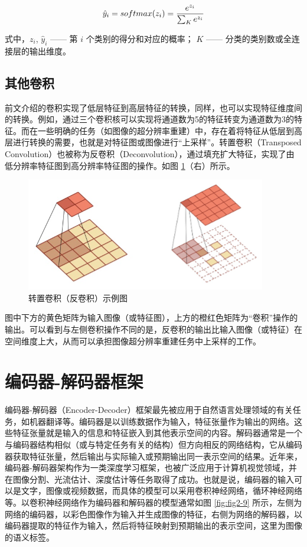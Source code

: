 \begin{equation}
	{\hat{y}}_i=softmax(z_i)=\frac{e^{z_i}}{\sum_{K} e^{z_i}}
	\label{equ:equ2-5}
	\vspace{0.3cm}
\end{equation}

\noindent 式中，$z_i$, ${\hat{y}}_i$ —— 第 $i$ 个类别的得分和对应的概率；\newline
\indent\quad $K$ —— 分类的类别数或全连接层的输出维度。

\subsection{其他卷积}

前文介绍的卷积实现了低层特征到高层特征的转换，同样，也可以实现特征维度间的转换。例如，通过三个卷积核可以实现将通道数为5的特征转变为通道数为3的特征。而在一些明确的任务（如图像的超分辨率重建）中，存在着将特征从低层到高层进行转换的需要，也就是对特征图或图像进行“上采样”。转置卷积（Transposed Convolution）也被称为反卷积（Deconvolution），通过填充扩大特征，实现了由低分辨率特征图到高分辨率特征图的操作。如图 \ref{fig:fig2-8}（右）所示。

\begin{figure}[!htbp]
	\vspace{-0.5cm}  %
	\centering
	\includegraphics{figures/9.png}
	\caption{转置卷积（反卷积）示例图}
	\label{fig:fig2-8}
\end{figure}

图中下方的黄色矩阵为输入图像（或特征图），上方的橙红色矩阵为“卷积”操作的输出。可以看到与左侧卷积操作不同的是，反卷积的输出比输入图像（或特征）在空间维度上大，从而可以承担图像超分辨率重建任务中上采样的工作。

\section{编码器-解码器框架}

编码器-解码器（Encoder-Decoder）框架最先被应用于自然语言处理领域的有关任务，如机器翻译等。编码器是以训练数据作为输入，特征张量作为输出的网络。这些特征张量就是输入的信息和特征嵌入到其他表示空间的内容。解码器通常是一个与编码器结构相似（或与特定任务有关的结构）但方向相反的网络结构，它从编码器获取特征张量，然后输出与实际输入或预期输出同一表示空间的结果。近年来，编码器-解码器架构作为一类深度学习框架，也被广泛应用于计算机视觉领域，并在图像分割、光流估计、深度估计等任务取得了成功。也就是说，编码器的输入可以是文字，图像或视频数据，而具体的模型可以采用卷积神经网络，循环神经网络等。以卷积神经网络作为编码器和解码器的模型通常如图 \ref{fig:fig2-9} 所示，左侧为网络的编码器，以彩色图像作为输入并生成图像的特征，右侧为网络的解码器，以编码器提取的特征作为输入，然后将特征映射到预期输出的表示空间，这里为图像的语义标签。


